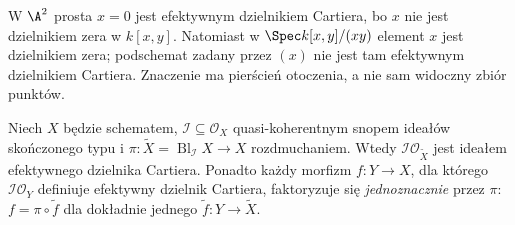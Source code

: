 \begin{przyklad}
W $\A^2$ prosta $x=0$ jest efektywnym dzielnikiem Cartiera,
bo $x$ nie jest dzielnikiem zera w $k[x,y]$.
Natomiast w $\Spec k[x,y]/(xy)$ element $x$ jest dzielnikiem
zera; podschemat zadany przez $(x)$ nie jest tam efektywnym
dzielnikiem Cartiera. Znaczenie ma pierścień otoczenia,
a nie sam widoczny zbiór punktów.
\end{przyklad}

\begin{twierdzenie}
\label{tw:ga5-universal}
Niech $X$ będzie schematem, $\mathcal I\subseteq\mathcal O_X$
quasi-koherentnym snopem ideałów skończonego typu i
$\pi:\widetilde X=\operatorname{Bl}_{\mathcal I}X\to X$
rozdmuchaniem. Wtedy $\mathcal I\mathcal O_{\widetilde X}$
jest ideałem efektywnego dzielnika Cartiera. Ponadto
każdy morfizm $f:Y\to X$, dla którego
$\mathcal I\mathcal O_Y$ definiuje efektywny dzielnik
Cartiera, faktoryzuje się \emph{jednoznacznie} przez $\pi$:
$ f=\pi\circ\widetilde f$ dla dokładnie jednego
$\widetilde f:Y\to\widetilde X$.
\end{twierdzenie}
